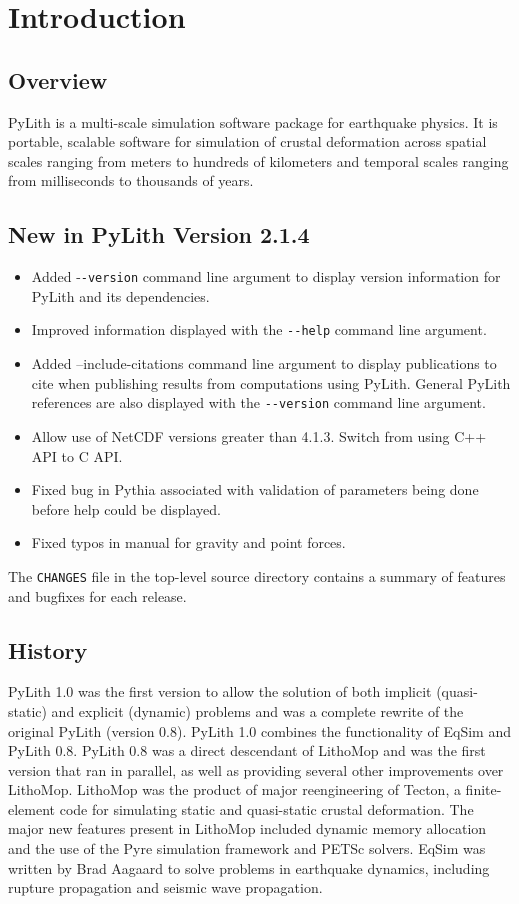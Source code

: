 
\chapter{Introduction}


\section{Overview}

PyLith is a multi-scale simulation software package for earthquake
physics. It is portable, scalable software for simulation of crustal
deformation across spatial scales ranging from meters to hundreds
of kilometers and temporal scales ranging from milliseconds to thousands
of years.


\section{New in PyLith Version 2.1.4}
\begin{itemize}
\item Added -\texttt{-version} command line argument to display version
information for PyLith and its dependencies.
\item Improved information displayed with the \texttt{-{}-help} command
line argument.
\item Added --include-citations command line argument to display publications
to cite when publishing results from computations using PyLith. General
PyLith references are also displayed with the \texttt{-{}-version}
command line argument.
\item Allow use of NetCDF versions greater than 4.1.3. Switch from using
C++ API to C API.
\item Fixed bug in Pythia associated with validation of parameters being
done before help could be displayed.
\item Fixed typos in manual for gravity and point forces.
\end{itemize}
The \texttt{CHANGES} file in the top-level source directory contains
a summary of features and bugfixes for each release.


\section{History}

PyLith 1.0 was the first version to allow the solution of both implicit
(quasi-static) and explicit (dynamic) problems and was a complete
rewrite of the original PyLith (version 0.8). PyLith 1.0 combines
the functionality of EqSim \cite{Aagaard:etal:2001a,Aagaard:etal:2001b}
and PyLith 0.8. PyLith 0.8 was a direct descendant of LithoMop and
was the first version that ran in parallel, as well as providing several
other improvements over LithoMop. LithoMop was the product of major
reengineering of Tecton, a finite-element code for simulating static
and quasi-static crustal deformation. The major new features present
in LithoMop included dynamic memory allocation and the use of the
Pyre simulation framework and PETSc solvers. EqSim was written by
Brad Aagaard to solve problems in earthquake dynamics, including rupture
propagation and seismic wave propagation.

